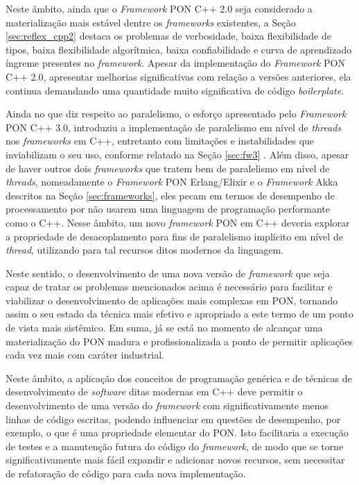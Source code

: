 Neste âmbito, ainda que o \textit{Framework} PON C++ 2.0 seja considerado a
materialização mais estável dentre os \textit{frameworks} existentes, a Seção
\ref{sec:reflex_cpp2} destaca os problemas de verbosidade, baixa flexibilidade
de tipos, baixa flexibilidade algorítmica, baixa confiabilidade e curva de
aprendizado íngreme presentes no \textit{framework}. Apesar da implementação do
\textit{Framework} PON C++ 2.0, apresentar melhorias significativas com relação
a versões anteriores, ela continua demandando uma quantidade muito significativa
de código \textit{boilerplate}.

Ainda no que diz respeito ao paralelismo, o esforço apresentado pelo
\textit{Framework} PON C++ 3.0, introduziu a implementação de paralelismo em
nível de \textit{threads} nos \textit{frameworks} em C++, entretanto com
limitações e instabilidades que inviabilizam o seu uso, conforme relatado na
Seção \ref{sec:fw3} \cite{martini_2019}. Além disso, apesar de haver outros dois
\textit{frameworks} que tratem bem de paralelismo em nível de \textit{threads},
nomeadamente o \textit{Framework} PON Erlang/Elixir e o \textit{Framework} Akka
descritos na Seção \ref{sec:frameworks}, eles pecam em termos de desempenho de
processamento por não usarem uma linguagem de programação performante como o
C++. Nesse âmbito, um novo \textit{framework} PON em C++ deveria explorar a
propriedade de desacoplamento para fins de paralelismo implícito em nível de
\textit{thread}, utilizando para tal recursos ditos modernos da linguagem.

Neste sentido, o desenvolvimento de uma nova versão de \textit{framework} que
seja capaz de tratar os problemas mencionados acima é necessário para facilitar
e viabilizar o desenvolvimento de aplicações mais complexas em PON, tornando
assim o seu estado da técnica mais efetivo e apropriado a este termo de um ponto
de vista mais sistêmico. Em suma, já se está no momento de alcançar uma
materialização do PON madura e profissionalizada a ponto de permitir aplicações
cada vez mais com caráter industrial.

Neste âmbito, a aplicação dos conceitos de programação genérica e de
técnicas de desenvolvimento de \textit{software} ditas modernas em C++ deve
permitir o desenvolvimento de uma versão do \textit{framework} com
significativamente menos linhas de código escritas, podendo influenciar em questões
de desempenho, por exemplo, o que é uma propriedade elementar do PON. Isto
facilitaria a execução de testes e a manutenção futura do código do
\textit{framework}, de modo que se torne significativamente mais fácil expandir
e adicionar novos recursos, sem necessitar de refatoração de código para cada
nova implementação.

